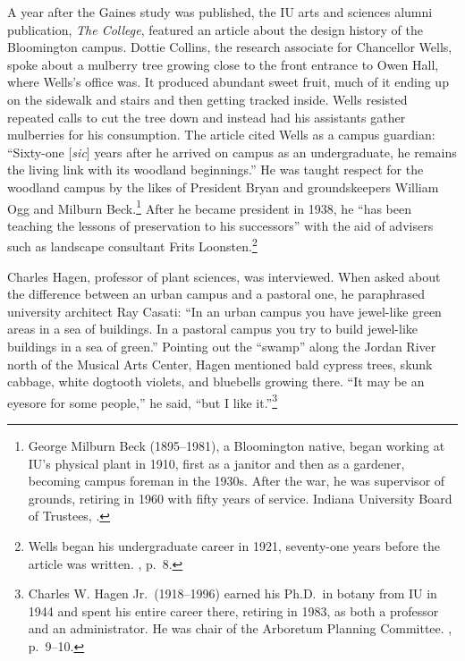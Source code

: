 \documentclass[
  american,
  letterpaper,
]{scrreprt}
\begin{document}
A year after the Gaines study was published, the IU arts and sciences
alumni publication, \emph{The College}, featured an article about the
design history of the Bloomington campus. Dottie Collins, the research
associate for Chancellor Wells, spoke about a mulberry tree growing
close to the front entrance to Owen Hall, where Wells's office was. It
produced abundant sweet fruit, much of it ending up on the sidewalk and
stairs and then getting tracked inside. Wells resisted repeated calls to
cut the tree down and instead had his assistants gather mulberries for
his consumption. The article cited Wells as a campus guardian:
``Sixty-one {[}\emph{sic}{]} years after he arrived on campus as an
undergraduate, he remains the living link with its woodland
beginnings.'' He was taught respect for the woodland campus by the likes
of President Bryan and groundskeepers William Ogg and Milburn
Beck.\footnote{George Milburn Beck (1895--1981), a Bloomington native,
  began working at IU's physical plant in 1910, first as a janitor and
  then as a gardener, becoming campus foreman in the 1930s. After the
  war, he was supervisor of grounds, retiring in 1960 with fifty years
  of service. Indiana University Board of Trustees,
  .}
After he became president in 1938, he ``has been teaching the lessons of
preservation to his successors'' with the aid of advisers such as
landscape consultant Frits Loonsten.\footnote{Wells began his
  undergraduate career in 1921, seventy-one years before the article was
  written. , p.~8.}

Charles Hagen, professor of plant sciences, was interviewed. When asked
about the difference between an urban campus and a pastoral one, he
paraphrased university architect Ray Casati: ``In an urban campus you
have jewel-like green areas in a sea of buildings. In a pastoral campus
you try to build jewel-like buildings in a sea of green.'' Pointing out
the ``swamp'' along the Jordan River north of the Musical Arts Center,
Hagen mentioned bald cypress trees, skunk cabbage, white dogtooth
violets, and bluebells growing there. ``It may be an eyesore for some
people,'' he said, ``but I like it.''\footnote{Charles W. Hagen
  Jr.~(1918--1996) earned his Ph.D.~in botany from IU in 1944 and spent
  his entire career there, retiring in 1983, as both a professor and an
  administrator. He was chair of the Arboretum Planning Committee.
  , p.~9--10.}
\end{document}
